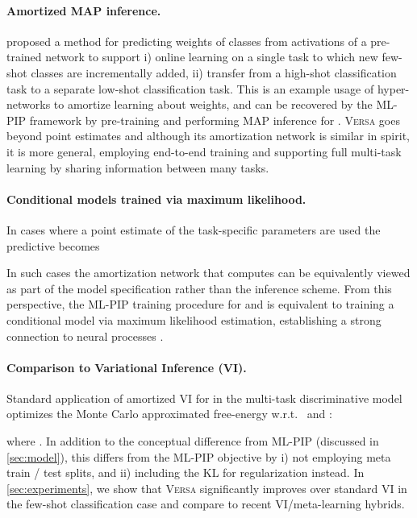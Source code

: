 \documentclass{article}
\newcommand{\Versa}{\textsc{Versa}}
\begin{document}
\paragraph{Amortized MAP inference.} \citet{qiao2017few} proposed a method for predicting weights of classes from activations of a pre-trained network to support i) online learning on a single task to which new few-shot classes are incrementally added, ii) transfer from a high-shot classification task to a separate low-shot classification task. This is an example usage of hyper-networks \citep{ha2016hypernetworks} to amortize learning about weights, and can be recovered by the ML-PIP framework by pre-training  and performing MAP inference for . 
\Versa{} goes beyond point estimates and although its amortization network is similar in spirit, it is more general, employing end-to-end training and supporting full multi-task learning by sharing information between many tasks.

\paragraph{Conditional models trained via maximum likelihood.} In cases where a point estimate of the task-specific parameters are used the predictive becomes 

In such cases the amortization network that computes  can be equivalently viewed as part of the model specification rather than the inference scheme. From this perspective, the ML-PIP training procedure for  and  is equivalent to training a conditional model  via maximum likelihood estimation, establishing a strong connection to neural processes \citep{garnelo2018conditional, garnelo2018neural}.

\paragraph{Comparison to Variational Inference (VI).} Standard application of amortized VI \citep{kingma2013auto,rezende2014stochastic,kingma2015variational,blundell2015weight} for  in the multi-task discriminative model optimizes the Monte Carlo approximated free-energy w.r.t.~ and :   

where . In addition to the conceptual difference from ML-PIP (discussed in \cref{sec:model}), this differs from the ML-PIP objective by i) not employing meta train / test splits, and ii) including the KL for regularization instead.
In \cref{sec:experiments}, we show that \Versa{} significantly improves over standard VI in the few-shot classification case and compare to recent VI/meta-learning hybrids. 
\end{document}

